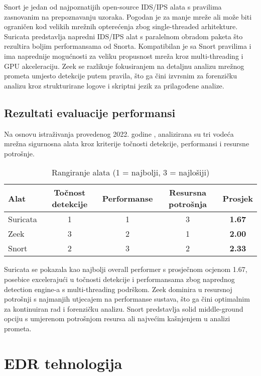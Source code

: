 \documentclass[utf8, seminar]{fer}
\begin{document}
Snort je jedan od najpoznatijih open-source IDS/IPS alata s pravilima zasnovanim na prepoznavanju uzoraka. Pogodan je za manje mreže ali može biti ograničen kod velikih mrežnih opterećenja zbog single-threaded arhitekture. Suricata predstavlja napredni IDS/IPS alat s paralelnom obradom paketa što rezultira boljim performansama od Snorta. Kompatibilan je sa Snort pravilima i ima naprednije mogućnosti za veliku propusnost mreža kroz multi-threading i GPU akceleraciju. Zeek se razlikuje fokusiranjem na detaljnu analizu mrežnog prometa umjesto detekcije putem pravila, što ga čini izvrsnim za forenzičku analizu kroz strukturirane logove i skriptni jezik za prilagođene analize.

\section{Rezultati evaluacije performansi}

Na osnovu istraživanja provedenog 2022. godine \cite{sans_comparative_study}, analizirana su tri vodeća mrežna sigurnosna alata kroz kriterije točnosti detekcije, performansi i resursne potrošnje.

\begin{table}[h]
\centering
\begin{tabular}{|l|c|c|c|c|}
\hline
\textbf{Alat} & \textbf{Točnost detekcije} & \textbf{Performanse} & \textbf{Resursna potrošnja} & \textbf{Prosjek} \\
\hline
Suricata & 1 & 1 & 3 & \textbf{1.67} \\
\hline
Zeek & 3 & 2 & 1 & \textbf{2.00} \\
\hline
Snort & 2 & 3 & 2 & \textbf{2.33} \\
\hline
\end{tabular}
\caption{Rangiranje alata (1 = najbolji, 3 = najlošiji)}
\end{table}

Suricata se pokazala kao najbolji overall performer s prosječnom ocjenom 1.67, posebice excelerajući u točnosti detekcije i performansama zbog naprednog detection engine-a s multi-threading podrškom. Zeek dominira u resursnoj potrošnji s najmanjih utjecajem na performanse sustava, što ga čini optimalnim za kontinuiran rad i forenzičku analizu. Snort predstavlja solid middle-ground opciju s umjerenom potrošnjom resursa ali najvećim kašnjenjem u analizi prometa.

\chapter{EDR tehnologija}
\end{document}
